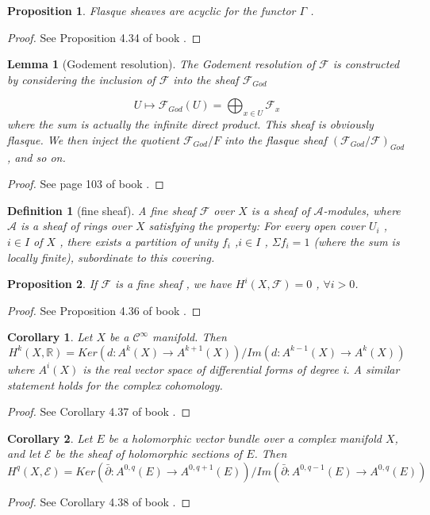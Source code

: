\documentclass{article}
\numberwithin{equation}{subsection} %
\newtheorem{defi}{Definition}[section]
\newtheorem{lemma}{Lemma}[section]
\newtheorem{prop}{Proposition}[section]
\newtheorem{coro}{Corollary}[section]
\theoremstyle{definition}
\begin{document}
\begin{prop}
Flasque sheaves are acyclic for the functor $\Gamma$ .
\end{prop}
\begin{proof}
	See Proposition 4.34 of book \cite{voisin}.
\end{proof}
\begin{lemma}[Godement resolution]
The Godement resolution of $\mathcal{F}$ is constructed by considering the inclusion of $\mathcal{F}$ into the sheaf $\mathcal{F}_{God}$

$$ U\mapsto \mathcal{F}_{God}(U)=\bigoplus_{x\in U} \mathcal{F}_x$$
where the sum is actually the infinite direct product. This sheaf is obviously flasque. We then inject the quotient $\mathcal{F}_{God} /F$ into the flasque sheaf $(\mathcal{F}_{God}/\mathcal{F})_{God}$ , and so on.
\end{lemma}

\begin{proof}
	See page 103 of book \cite{voisin}.
\end{proof}
\begin{defi}[fine sheaf]
A fine sheaf $\mathcal{F}$ over $X$ is a sheaf of $\mathcal{A}$-modules, where $\mathcal{A}$ is a sheaf of rings over $X$ satisfying the property:
For every open cover $U_i$
,$i\in I$ of $X$ , there exists a partition of unity $f_i$
,$i\in I$ , $\Sigma f_i=1$ (where the sum is locally finite), subordinate to this covering.
\end{defi}

\begin{prop}
	If $\mathcal{F}$ is a fine sheaf , we have $H^i(X,\mathcal{F})=0$ , $\forall i>0$.
\end{prop}
\begin{proof}
	See Proposition 4.36 of book \cite{voisin}.
\end{proof}

\begin{coro}
Let $X$ be a $\mathcal{C}^{\infty}$ manifold. Then
$$H^k(X,\mathbb{R})=Ker(d:A^k(X)\to A^{k+1}(X))/Im(d:A^{k-1}(X)\to A^k(X))$$
where $A^i(X)$ is the real vector space of differential forms of degree i. A similar statement holds for the complex cohomology.
\end{coro}
\begin{proof}
	See Corollary 4.37 of book \cite{voisin}.
\end{proof}

\begin{coro}
Let $E$ be a holomorphic vector bundle over a complex manifold $X$, and let $\mathcal{E}$ be the sheaf of holomorphic sections of $E$. Then
$$H^q(X,\mathcal{E})=Ker(\bar{\partial}:A^{0,q}(E)\to A^{0,q+1}(E))/Im(\bar{\partial}:A^{0,q-1}(E)\to A^{0,q}(E))$$
\end{coro}
\begin{proof}
	See Corollary 4.38 of book \cite{voisin}.
\end{proof}
\end{document}

